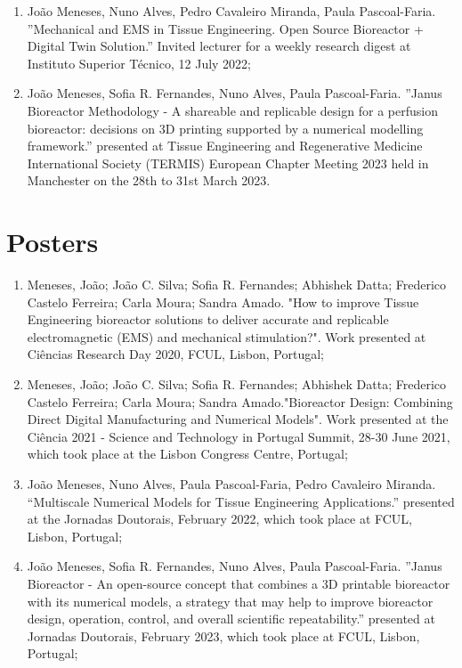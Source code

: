 \begin{enumerate}
\item \small João Meneses, Nuno Alves, Pedro Cavaleiro Miranda, Paula Pascoal-Faria. ''Mechanical and EMS in Tissue Engineering. Open Source Bioreactor + Digital Twin Solution.'' Invited lecturer for a weekly research digest at Instituto Superior Técnico, 12 July 2022;
\item \small João Meneses, Sofia R. Fernandes, Nuno Alves, Paula Pascoal-Faria. ''Janus Bioreactor Methodology - A shareable and replicable design for a perfusion bioreactor: decisions on 3D printing supported by a numerical modelling framework.'' presented at Tissue Engineering and Regenerative Medicine International Society (TERMIS) European Chapter Meeting 2023 held in Manchester on the 28th to 31st March 2023. 
\end{enumerate}


\section{Posters}
\begin{enumerate}
\item \small Meneses, João; João C. Silva; Sofia R. Fernandes; Abhishek Datta; Frederico Castelo Ferreira; Carla Moura;
Sandra Amado. "How to improve Tissue Engineering bioreactor solutions to deliver accurate and replicable electromagnetic (EMS) and mechanical stimulation?". Work presented at Ciências Research Day 2020, FCUL, Lisbon, Portugal;
\item \small Meneses, João; João C. Silva; Sofia R. Fernandes; Abhishek Datta; Frederico Castelo Ferreira; Carla Moura;
Sandra Amado."Bioreactor Design: Combining Direct Digital Manufacturing and Numerical Models". Work presented at the Ciência 2021 - Science and Technology in Portugal Summit, 28-30 June 2021, which took place at the Lisbon Congress Centre, Portugal;
\item \small João Meneses, Nuno Alves, Paula Pascoal-Faria, Pedro Cavaleiro Miranda. “Multiscale Numerical Models for Tissue Engineering Applications.” presented at the Jornadas Doutorais, February 2022, which took place at FCUL, Lisbon, Portugal;
\item \small João Meneses, Sofia R. Fernandes, Nuno Alves, Paula Pascoal-Faria. ''Janus Bioreactor - An open-source concept that combines a 3D printable bioreactor with its numerical models, a strategy that may help to improve bioreactor design, operation, control, and overall scientific repeatability.'' presented at Jornadas Doutorais, February 2023, which took place at FCUL, Lisbon, Portugal;
\end{enumerate}


